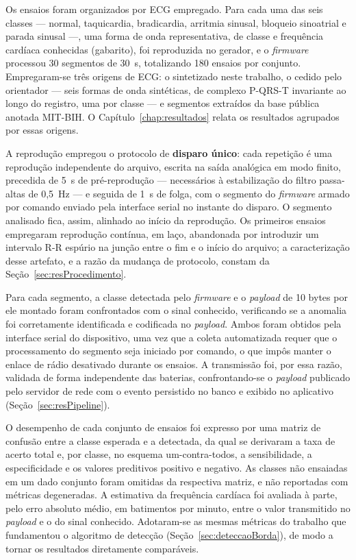 Os ensaios foram organizados por \acs{ECG} empregado. Para cada uma das seis classes --- normal, taquicardia, bradicardia, arritmia sinusal, bloqueio sinoatrial e parada sinusal ---, uma forma de onda representativa, de classe e frequência cardíaca conhecidas (gabarito), foi reproduzida no gerador, e o \textit{firmware} processou 30 segmentos de 30~s, totalizando 180 ensaios por conjunto. Empregaram-se três origens de \acs{ECG}: o sintetizado neste trabalho, o cedido pelo orientador --- seis formas de onda sintéticas, de complexo P-QRS-T invariante ao longo do registro, uma por classe --- e segmentos extraídos da base pública anotada MIT-BIH. O Capítulo~\ref{chap:resultados} relata os resultados agrupados por essas origens.

A reprodução empregou o protocolo de \textbf{disparo único}: cada repetição é uma reprodução independente do arquivo, escrita na saída analógica em modo finito, precedida de 5~s de pré-reprodução --- necessários à estabilização do filtro passa-altas de 0,5~Hz --- e seguida de 1~s de folga, com o segmento do \textit{firmware} armado por comando enviado pela interface serial no instante do disparo. O segmento analisado fica, assim, alinhado ao início da reprodução. Os primeiros ensaios empregaram reprodução contínua, em laço, abandonada por introduzir um intervalo R-R espúrio na junção entre o fim e o início do arquivo; a caracterização desse artefato, e a razão da mudança de protocolo, constam da Seção~\ref{sec:resProcedimento}.

Para cada segmento, a classe detectada pelo \textit{firmware} e o \textit{payload} de 10 bytes por ele montado foram confrontados com o sinal conhecido, verificando se a anomalia foi corretamente identificada e codificada no \textit{payload}. Ambos foram obtidos pela interface serial do dispositivo, uma vez que a coleta automatizada requer que o processamento do segmento seja iniciado por comando, o que impôs manter o enlace de rádio desativado durante os ensaios. A transmissão foi, por essa razão, validada de forma independente das baterias, confrontando-se o \textit{payload} publicado pelo servidor de rede com o evento persistido no banco e exibido no aplicativo (Seção~\ref{sec:resPipeline}).

O desempenho de cada conjunto de ensaios foi expresso por uma matriz de confusão entre a classe esperada e a detectada, da qual se derivaram a taxa de acerto total e, por classe, no esquema um-contra-todos, a sensibilidade, a especificidade e os valores preditivos positivo e negativo. As classes não ensaiadas em um dado conjunto foram omitidas da respectiva matriz, e não reportadas com métricas degeneradas. A estimativa da frequência cardíaca foi avaliada à parte, pelo erro absoluto médio, em batimentos por minuto, entre o valor transmitido no \textit{payload} e o do sinal conhecido. Adotaram-se as mesmas métricas do trabalho que fundamentou o algoritmo de detecção (Seção~\ref{sec:deteccaoBorda}), de modo a tornar os resultados diretamente comparáveis.

